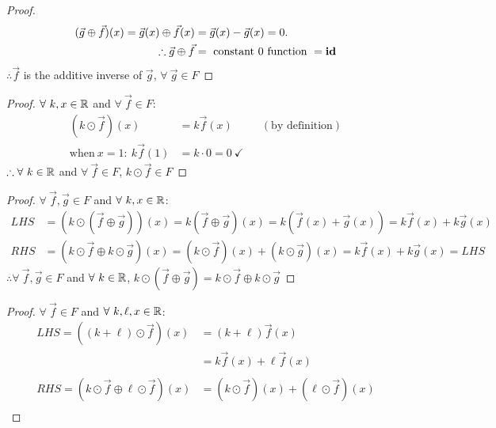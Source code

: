 \documentclass{article}
\begin{document}
\begin{enumerate}
\begin{proof}
\begin{align*}
            (\vec{g} \oplus \vec{f})(x) = \vec{g}(x) \oplus \vec{f}(x) & = \vec{g}(x) - \vec{g}(x)= 0.        \\
            \therefore \vec{g} \oplus \vec{f}                          & = ~\text{constant 0 function}~ = \operatorname{\textbf{id}}
        \end{align*}
        $\therefore \vec{f}$ is the additive inverse of $\vec{g}$, $\forall~\vec{g} \in F$
    \end{proof}
    \begin{proof}
        $\forall~k,x \in \mathbb{R}$ and $\forall~\vec{f} \in F$:
        \begin{align*}
            (k \odot \vec{f})(x)         & = k\vec{f}(x)              &  & (\text{by definition}) \\
            \text{when}~x=1:~k\vec{f}(1) & = k \cdot 0 = 0~\checkmark
        \end{align*}
        $\therefore \forall~k \in \mathbb{R}$ and $\forall~\vec{f} \in F$, $k\odot\vec{f} \in F$
    \end{proof}
    \begin{proof}
        $\forall~\vec{f},\vec{g} \in F$ and $\forall~k, x \in \mathbb{R}$:
        \begin{align*}
            LHS & = (k \odot (\vec{f} \oplus \vec{g}))(x) = k(\vec{f} \oplus \vec{g})(x) = k(\vec{f}(x) + \vec{g}(x)) = k\vec{f}(x) + k\vec{g}(x) \\
            RHS & = (k \odot \vec{f} \oplus k \odot \vec{g})(x) = (k \odot \vec{f})(x) + (k \odot \vec{g})(x) = k\vec{f}(x) + k\vec{g}(x) = LHS
        \end{align*}
        $\therefore \forall~\vec{f},\vec{g} \in F$ and $\forall~k \in \mathbb{R}$, $k \odot (\vec{f} \oplus \vec{g}) = k \odot \vec{f} \oplus k \odot \vec{g}$
    \end{proof}
    \begin{proof}
        $\forall~\vec{f} \in F$ and $\forall~k, \ell, x \in \mathbb{R}$:
        \begin{align*}
            LHS = ((k + \ell) \odot \vec{f})(x)                  & = (k+\ell)\vec{f}(x)                             \\
                                                                 & = k\vec{f}(x) + \ell\vec{f}(x)                   \\ \\
            RHS = (k \odot \vec{f} \oplus \ell \odot \vec{f})(x) & = (k \odot \vec{f})(x) + (\ell \odot \vec{f})(x) \\

\end{align*}
\end{proof}
\end{enumerate}
\end{document}

